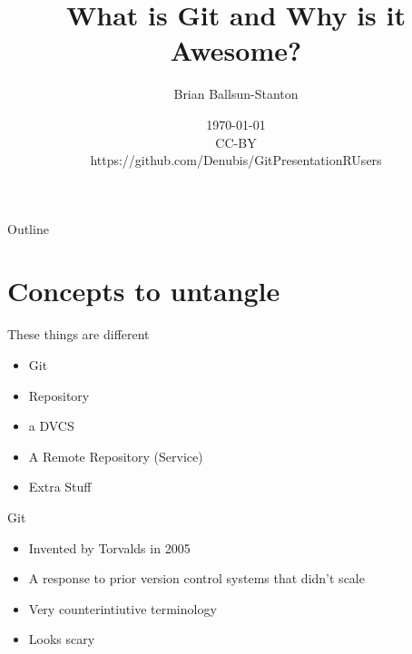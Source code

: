 \documentclass[aspectratio=1610]{beamer} %
\title{What is Git and Why is it Awesome?} %
\author{Brian Ballsun-Stanton}               %
\institute{Solutions Architect (Digital Humanities), Faculty of Arts}         %
\date{\today\\CC-BY\\https://github.com/Denubis/GitPresentationRUsers}                 %
\begin{document}
\begin{frame}
  \titlepage

  
\end{frame}

\begin{frame}{Outline}
  \tableofcontents
\end{frame}

%

\section{Concepts to untangle}

\begin{frame}{These things are different}
  
    \begin{itemize}
    \item Git
    \item Repository
    \item a DVCS
    \item A Remote Repository (Service)
    \item Extra Stuff
  \end{itemize}
\end{frame}


\begin{frame}{Git}
  
    \begin{itemize}
    \item Invented by Torvalds in 2005
    \item A response to prior version control systems that didn't scale
    \item Very counterintiutive terminology
    \item Looks scary    
  \end{itemize}
\end{frame}
\end{document}
